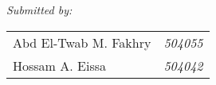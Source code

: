 {
  \centering
  \Large
  \textsl{Submitted by:} \\
  \bfseries
  {
    \begin{tabular}{lr}
      Abd El-Twab M. Fakhry & \textsl{504055} \\
      Hossam A. Eissa & \textsl{504042}
    \end{tabular}
  }
  \par
}